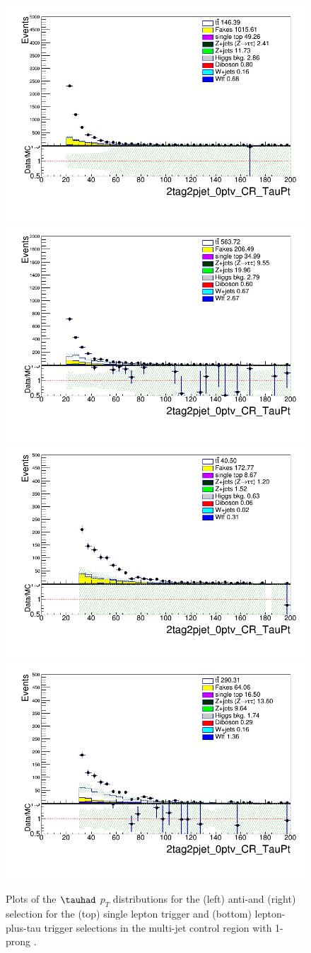 \begin{figure}
\centering
\includegraphics[width=.45\textwidth]{figures/lephadFF/SLT/2tag2pjet_0ptv_CR_TauPt_IICR_SLT_ALL_ttWeight_1.png}
\includegraphics[width=.45\textwidth]{figures/lephadFF/SLT/2tag2pjet_0ptv_CR_TauPt_IISR_SLT_ALL_ttWeight_1.png} \\
\includegraphics[width=.45\textwidth]{figures/lephadFF/LTT/2tag2pjet_0ptv_CR_TauPt_IICR_LTT_ALL_ttWeight_1.png}
\includegraphics[width=.45\textwidth]{figures/lephadFF/LTT/2tag2pjet_0ptv_CR_TauPt_IISR_LTT_ALL_ttWeight_1.png}\\
\caption{Plots of the $\tauhad$ $p_T$ distributions for the (left) anti-\tauhad and (right) \tauhad selection for the (top) single lepton trigger and (bottom) lepton-plus-tau trigger selections in the multi-jet control region with 1-prong \tauhad.}
\label{fig:QCD_CR_1}
\end{figure}

